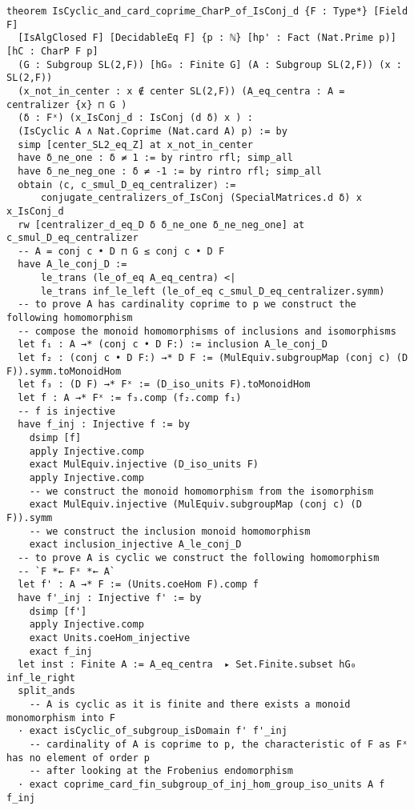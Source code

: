 \begin{footnotesize}
\begin{verbatim}
theorem IsCyclic_and_card_coprime_CharP_of_IsConj_d {F : Type*} [Field F]
  [IsAlgClosed F] [DecidableEq F] {p : ℕ} [hp' : Fact (Nat.Prime p)] [hC : CharP F p]
  (G : Subgroup SL(2,F)) [hG₀ : Finite G] (A : Subgroup SL(2,F)) (x : SL(2,F))
  (x_not_in_center : x ∉ center SL(2,F)) (A_eq_centra : A = centralizer {x} ⊓ G )
  (δ : Fˣ) (x_IsConj_d : IsConj (d δ) x ) :
  (IsCyclic A ∧ Nat.Coprime (Nat.card A) p) := by
  simp [center_SL2_eq_Z] at x_not_in_center
  have δ_ne_one : δ ≠ 1 := by rintro rfl; simp_all
  have δ_ne_neg_one : δ ≠ -1 := by rintro rfl; simp_all
  obtain ⟨c, c_smul_D_eq_centralizer⟩ :=
      conjugate_centralizers_of_IsConj (SpecialMatrices.d δ) x x_IsConj_d
  rw [centralizer_d_eq_D δ δ_ne_one δ_ne_neg_one] at c_smul_D_eq_centralizer
  -- A = conj c • D ⊓ G ≤ conj c • D F
  have A_le_conj_D :=
      le_trans (le_of_eq A_eq_centra) <|
      le_trans inf_le_left (le_of_eq c_smul_D_eq_centralizer.symm)
  -- to prove A has cardinality coprime to p we construct the following homomorphism
  -- compose the monoid homomorphisms of inclusions and isomorphisms
  let f₁ : A →* (conj c • D F:) := inclusion A_le_conj_D
  let f₂ : (conj c • D F:) →* D F := (MulEquiv.subgroupMap (conj c) (D F)).symm.toMonoidHom
  let f₃ : (D F) →* Fˣ := (D_iso_units F).toMonoidHom
  let f : A →* Fˣ := f₃.comp (f₂.comp f₁)
  -- f is injective
  have f_inj : Injective f := by
    dsimp [f]
    apply Injective.comp
    exact MulEquiv.injective (D_iso_units F)
    apply Injective.comp
    -- we construct the monoid homomorphism from the isomorphism
    exact MulEquiv.injective (MulEquiv.subgroupMap (conj c) (D F)).symm
    -- we construct the inclusion monoid homomorphism
    exact inclusion_injective A_le_conj_D
  -- to prove A is cyclic we construct the following homomorphism
  -- `F *← Fˣ *← A`
  let f' : A →* F := (Units.coeHom F).comp f
  have f'_inj : Injective f' := by
    dsimp [f']
    apply Injective.comp
    exact Units.coeHom_injective
    exact f_inj
  let inst : Finite A := A_eq_centra  ▸ Set.Finite.subset hG₀ inf_le_right
  split_ands
    -- A is cyclic as it is finite and there exists a monoid monomorphism into F
  · exact isCyclic_of_subgroup_isDomain f' f'_inj
    -- cardinality of A is coprime to p, the characteristic of F as Fˣ has no element of order p
    -- after looking at the Frobenius endomorphism
  · exact coprime_card_fin_subgroup_of_inj_hom_group_iso_units A f f_inj
\end{verbatim}
\end{footnotesize}

